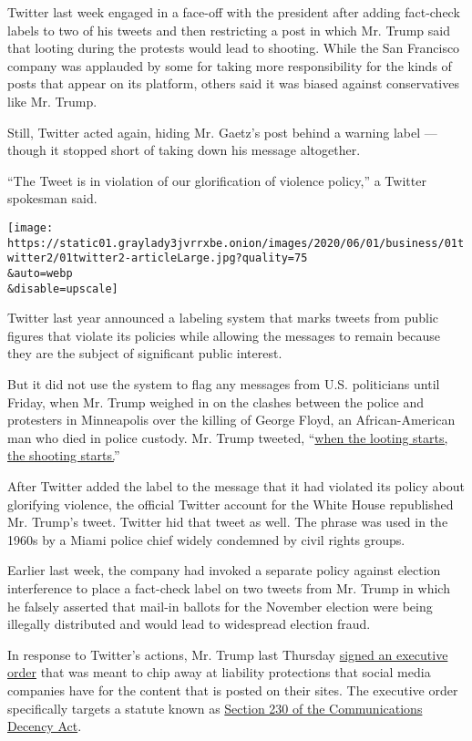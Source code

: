 Twitter last week engaged in a face-off with the president after adding
fact-check labels to two of his tweets and then restricting a post in
which Mr. Trump said that looting during the protests would lead to
shooting. While the San Francisco company was applauded by some for
taking more responsibility for the kinds of posts that appear on its
platform, others said it was biased against conservatives like Mr.
Trump.

Still, Twitter acted again, hiding Mr. Gaetz's post behind a warning
label --- though it stopped short of taking down his message altogether.

``The Tweet is in violation of our glorification of violence policy,'' a
Twitter spokesman said.

\texttt{[image: https://static01.graylady3jvrrxbe.onion/images/2020/06/01/business/01twitter2/01twitter2-articleLarge.jpg?quality=75\\\&auto=webp\\\&disable=upscale]}

Twitter last year announced a labeling system that marks tweets from
public figures that violate its policies while allowing the messages to
remain because they are the subject of significant public interest.

But it did not use the system to flag any messages from U.S. politicians
until Friday, when Mr. Trump weighed in on the clashes between the
police and protesters in Minneapolis over the killing of George Floyd,
an African-American man who died in police custody. Mr. Trump tweeted,
``\href{https://www.nytimes3xbfgragh.onion/2020/05/29/us/looting-starts-shooting-starts.html}{when
the looting starts, the shooting starts.}''

After Twitter added the label to the message that it had violated its
policy about glorifying violence, the official Twitter account for the
White House republished Mr. Trump's tweet. Twitter hid that tweet as
well. The phrase was used in the 1960s by a Miami police chief widely
condemned by civil rights groups.

Earlier last week, the company had invoked a separate policy against
election interference to place a fact-check label on two tweets from Mr.
Trump in which he falsely asserted that mail-in ballots for the November
election were being illegally distributed and would lead to widespread
election fraud.

In response to Twitter's actions, Mr. Trump last Thursday
\href{https://www.nytimes3xbfgragh.onion/2020/05/28/us/politics/trump-order-social-media.html}{signed
an executive order} that was meant to chip away at liability protections
that social media companies have for the content that is posted on their
sites. The executive order specifically targets a statute known as
\href{https://www.nytimes3xbfgragh.onion/2020/05/28/business/section-230-internet-speech.html}{Section
230 of the Communications Decency Act}.

